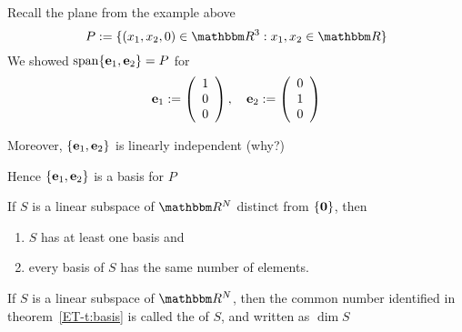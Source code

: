 \begin{frame}
    
    \vspace{2em}
    \Eg
    Recall the plane from the example above
    \begin{equation*}
        P := \setntn{(x_1, x_2, 0) \in \RR^3}{ x_1, x_2 \in \RR}
    \end{equation*}
    We showed $\operatorname{span}\{{\mathbf e}_1, {\mathbf e}_2\} = P$ for 
    \begin{equation*}
        {\mathbf e}_1 := 
        \left(
        \begin{array}{c}
            1 \\
            0 \\
            0
        \end{array}
        \right),
        \quad 
        {\mathbf e}_2 := 
        \left(
        \begin{array}{c}
            0 \\
            1 \\
            0
        \end{array}
        \right)
    \end{equation*}
    
    Moreover, $\{{\mathbf e}_1, {\mathbf e}_2\}$ is linearly independent (why?)

    Hence $\{{\mathbf e}_1, {\mathbf e}_2\}$ is a basis for $P$


\end{frame}

\begin{frame}

    \vspace{2em}
    \Thm{\eqref{ET-t:basis}}
    If $S$ is a linear subspace of $\RR^N$ distinct from $\{{\mathbf 0}\}$, then 
    \begin{enumerate}
        \item $S$ has at least one basis and
        \item every basis of $S$ has the same number of elements.
    \end{enumerate}
    If $S$ is a linear subspace of $\RR^N$, then the common number identified in
    theorem~\ref{ET-t:basis} is called the  of $S$, and written as
    $\dim S$
    
\end{frame}

